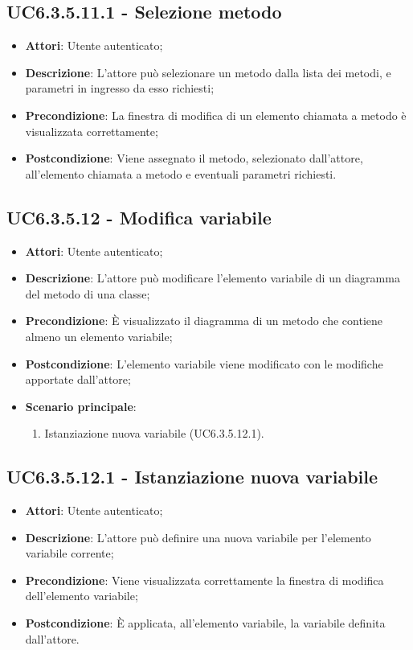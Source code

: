 \subsection{UC6.3.5.11.1 - Selezione metodo} 
\label{ssec:UC6.3.5.11.1} 
\begin{itemize} 
\item \textbf{Attori}: Utente autenticato;
\item \textbf{Descrizione}: L'attore può selezionare un metodo dalla lista dei metodi, e parametri in ingresso da esso richiesti;
\item \textbf{Precondizione}: La finestra di modifica di un elemento chiamata a metodo è visualizzata correttamente;
\item \textbf{Postcondizione}: Viene assegnato il metodo, selezionato dall'attore, all'elemento chiamata a metodo e eventuali parametri richiesti.
\end{itemize} 
\subsection{UC6.3.5.12 - Modifica variabile} 
\label{ssec:UC6.3.5.12} 
\begin{itemize} 
\item \textbf{Attori}: Utente autenticato;
\item \textbf{Descrizione}: L'attore può modificare l'elemento variabile di un diagramma del metodo di una classe;
\item \textbf{Precondizione}: È visualizzato il diagramma di un metodo che contiene almeno un elemento variabile;
\item \textbf{Postcondizione}: L'elemento variabile viene modificato con le modifiche apportate dall'attore;
\item \textbf{Scenario principale}: \begin{enumerate}\item Istanziazione nuova variabile (UC6.3.5.12.1). 
 \end{enumerate}
\end{itemize} 
\subsection{UC6.3.5.12.1 - Istanziazione nuova variabile} 
\label{ssec:UC6.3.5.12.1} 
\begin{itemize} 
\item \textbf{Attori}: Utente autenticato;
\item \textbf{Descrizione}: L'attore può definire una nuova variabile per l'elemento variabile corrente;
\item \textbf{Precondizione}: Viene visualizzata correttamente la finestra di modifica dell'elemento variabile;
\item \textbf{Postcondizione}: È applicata, all'elemento variabile, la variabile definita dall'attore.
\end{itemize} 
